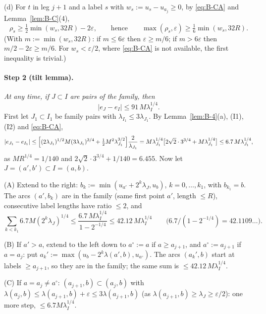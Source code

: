 (d) For $t$ in leg $j+1$ and a label $s$ with $w_s:=u_s-u_{a_j}\ge0$, by \eqref{eq:B-CA} and Lemma~\ref{lem:B-C}(4),
\begin{equation}\label{eq:B-star}
\rho_s\ge\tfrac12\min(w_s,32R)-2\varepsilon,\qquad\text{hence}\qquad\max(\rho_s,\varepsilon)\ge\tfrac16\min(w_s,32R).\tag{$*$}
\end{equation}
(With $m:=\min(w_s,32R)$: if $m\le6\varepsilon$ then $\varepsilon\ge m/6$; if $m>6\varepsilon$ then $m/2-2\varepsilon\ge m/6$. For
$w_s<\varepsilon/2$, where \eqref{eq:B-CA} is not available, the first inequality is trivial.)

\paragraph{Step 2 (tilt lemma).}
\emph{At any time, if $J\subset I$ are pairs of the family, then}
\begin{equation}\label{eq:B-TL}
|e_J-e_I|\le91\,M\lambda_I^{1/4}.\tag{TL}
\end{equation}
First let $J_1\subset I_1$ be family pairs with $\lambda_{I_1}\le3\lambda_{J_1}$. By Lemma~\ref{lem:B-4}(a), (I1), (I2) and
\eqref{eq:B-CA},
\[
|e_{J_1}-e_{I_1}|\le\Bigl[(2\lambda_{J_1})^{1/2}M(3\lambda_{J_1})^{3/4}+\tfrac12M^2\lambda_{J_1}^{3/2}\Bigr]\frac2{\lambda_{J_1}}
=M\lambda_{J_1}^{1/4}\bigl[2\sqrt2\cdot3^{3/4}+M\lambda_{J_1}^{1/4}\bigr]\le6.7\,M\lambda_{J_1}^{1/4},
\]
as $MR^{1/4}=1/140$ and $2\sqrt2\cdot3^{3/4}+1/140=6.455$. Now let $J=(a',b')\subset I=(a,b)$.

(A) Extend to the right: $b_k:=\min(u_{a'}+2^k\lambda_J,u_b)$, $k=0,\dots,k_1$, with $b_{k_1}=b$. The arcs $(a',b_k)$ are in the family
(same first point $a'$, length $\le R$), consecutive label lengths have ratio $\le2$, and
\[
\sum_{k<k_1}6.7M(2^k\lambda_J)^{1/4}\le\frac{6.7\,M\lambda_I^{1/4}}{1-2^{-1/4}}\le42.12\,M\lambda_I^{1/4}
\qquad\bigl(6.7/(1-2^{-1/4})=42.1109\ldots\bigr).
\]

(B) If $a'>a$, extend to the left down to $a^\circ:=a$ if $a\ge a_{j+1}$, and $a^\circ:=a_{j+1}$ if $a=a_j$: put
$a_k':=\max(u_b-2^k\lambda(a',b),u_{a^\circ})$. The arcs $(a_k',b)$ start at labels $\ge a_{j+1}$, so they are in the family; the
same sum is $\le42.12\,M\lambda_I^{1/4}$.

(C) If $a=a_j\ne a^\circ$: $(a_{j+1},b)\subset(a_j,b)$ with
$\lambda(a_j,b)\le\lambda(a_{j+1},b)+\varepsilon\le3\lambda(a_{j+1},b)$ (as $\lambda(a_{j+1},b)\ge\lambda_J\ge\varepsilon/2$): one
more step, $\le6.7M\lambda_I^{1/4}$.

